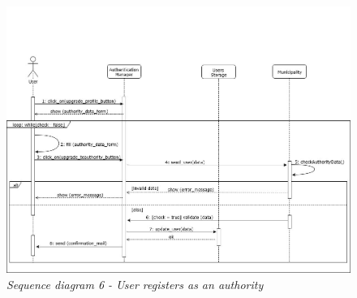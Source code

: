 \begin{figure}[H]
    \centering
    \includegraphics[width=\textwidth]{RASD_Images/SequenceDiagrams/6.jpg}
    \caption{\textit{Sequence diagram 6 - User registers as an authority}}
\end{figure}

